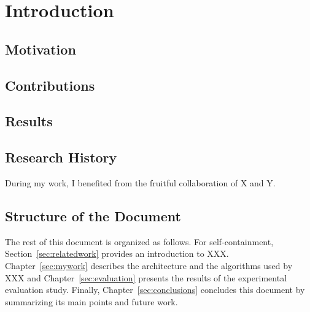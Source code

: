 \chapter{Introduction}

 
 \section{Motivation}

  
 \section{Contributions}
 
 
 \section{Results}
 
 
 \section{Research History}
 
During my work, I benefited from the fruitful collaboration of X and Y.
  
  
 \section{Structure of the Document}
  
 The rest of this document is organized as follows.  For
 self-containment, Section~\ref{sec:relatedwork} provides an
 introduction to XXX. Chapter~\ref{sec:mywork} describes the
 architecture and the algorithms used by XXX and
 Chapter~\ref{sec:evaluation} presents the results of the experimental
 evaluation study. Finally, Chapter~\ref{sec:conclusions} concludes
 this document by summarizing its main points and future work.
 